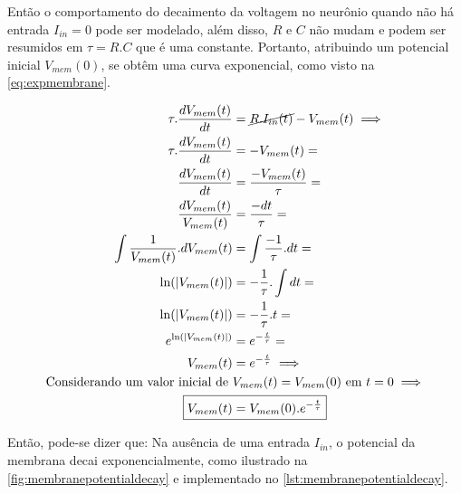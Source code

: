 			\par Então o comportamento do decaimento da voltagem no neurônio quando não há entrada $I_{in} = 0$ pode ser modelado, além disso, $R$ e $C$ não mudam e podem ser resumidos em $\tau = R.C$ que é uma constante. Portanto, atribuindo um potencial inicial $V_{mem}(0)$, se obtêm uma curva exponencial, como visto na \autoref{eq:expmembrane}.
			
			\begin{equation}
				\label{eq:expmembrane}
				\begin{aligned}
					\tau.\dfrac{dV_{mem}(t)}{dt} &= \cancel{R.I_{in}(t)} - V_{mem}(t) \implies \\
					\tau.\dfrac{dV_{mem}(t)}{dt} &= -V_{mem}(t) = \\
					\dfrac{dV_{mem}(t)}{dt} &= \dfrac{-V_{mem}(t)}{\tau} = \\
					\dfrac{dV_{mem}(t)}{V_{mem}(t)} &= \dfrac{-dt}{\tau} = \\
					\int\dfrac{1}{V_{mem}(t)}.dV_{mem}(t) &= \int\dfrac{-1}{\tau}.dt = \\
					\ln(|V_{mem}(t)|) &= -\dfrac{1}{\tau} . \int dt = \\
					\ln(|V_{mem}(t)|) &= -\dfrac{1}{\tau} . t = \\
					e^{\ln(|V_{mem}(t)|)} &= e^{-\frac{t}{\tau}} = \\
					V_{mem}(t) &= e^{-\frac{t}{\tau}} \implies \\
					\text{Considerando um valor inicial de } &V_{mem}(t) = V_{mem}(0) \text{ em } t=0 \implies \\
					\Aboxed{V_{mem}(t) &= V_{mem}(0).e^{-\frac{t}{\tau}}}
				\end{aligned}
			\end{equation}
			
			
			
			\par Então, pode-se dizer que: Na ausência de uma entrada $I_{in}$, o potencial da membrana decai exponencialmente, como ilustrado na  \autoref{fig:membranepotentialdecay} e implementado no \autoref{lst:membranepotentialdecay}.
			
